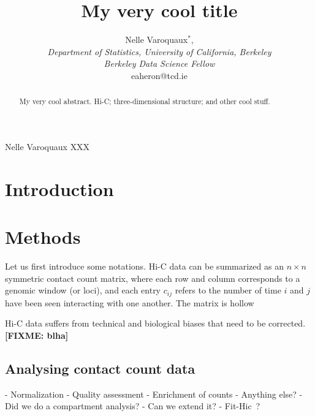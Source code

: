 \documentclass[oupdraft]{bio}
\newcommand{\fixme}[1]{\textbf{[FIXME: #1]}}
\begin{document}
\title{My very cool title}

\author{Nelle Varoquaux$^\ast$,\\[4pt]
\textit{Department of Statistics, University of California, Berkeley \\
Berkeley Data Science Fellow}
\\[2pt]
{eaheron@tcd.ie}}

\markboth%
{Nelle Varoquaux}
{XXX}

\maketitle


\begin{abstract}
{My very cool abstract.}
{Hi-C; three-dimensional structure; and other cool stuff.
}
\end{abstract}


\section{Introduction}
\label{sec1}


\section{Methods}
\label{sec2}

Let us first introduce some notations. Hi-C data can be summarized as an $n
\times n$ symmetric contact count matrix, where each row and column corresponds to a
genomic window (or loci), and each entry $c_{ij}$ refers to the number of time
$i$ and $j$ have been seen interacting with one another. The matrix is hollow

Hi-C data suffers from technical and biological biases that need to be
corrected. \fixme{blha} 


\subsection{Analysing contact count data}

- Normalization
- Quality assessment
- Enrichment of counts
- Anything else?
    - Did we do a compartment analysis?
- Can we extend it?
  - Fit-Hic ?
\end{document}
